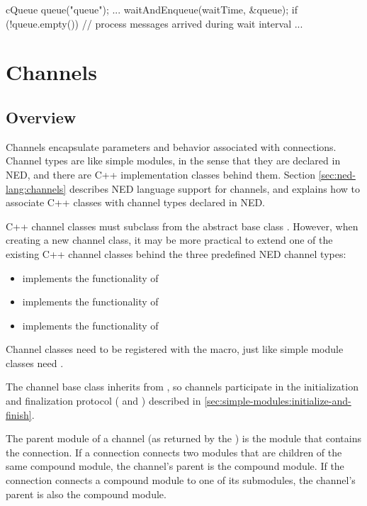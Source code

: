 \begin{cpp}
cQueue queue("queue");
...
waitAndEnqueue(waitTime, &queue);
if (!queue.empty())
{
    // process messages arrived during wait interval
    ...
}
\end{cpp}


\section{Channels}
\label{sec:simple-modules:channels}

\subsection{Overview}
\label{sec:simple-modules:channels-overview}

Channels encapsulate parameters and behavior associated with connections.
Channel types are like simple modules, in the sense that they are declared
in NED, and there are C++ implementation classes behind them. Section
\ref{sec:ned-lang:channels} describes NED language support for channels,
and explains how to associate C++ classes with channel types declared in
NED.

C++ channel classes must subclass from the abstract base class
. However, when creating a new channel class, it may be
more practical to extend one of the existing C++ channel classes behind the
three predefined NED channel types:

\begin{itemize}
  \item {} implements the functionality of 
  \item {} implements the functionality of 
  \item {} implements the functionality of 
\end{itemize}

Channel classes need to be registered with the  macro,
just like simple module classes need .

The channel base class  inherits from ,
so channels participate in the initialization and finalization protocol
( and ) described in
\ref{sec:simple-modules:initialize-and-finish}.

The parent module of a channel (as returned by the
) is the module that contains
the connection. If a connection connects two modules that are children of
the same compound module, the channel's parent is the compound module. If
the connection connects a compound module to one of its submodules, the
channel's parent is also the compound module.


